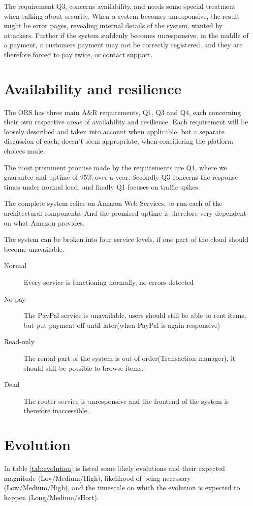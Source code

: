 The requirement Q3, concerns availability, and needs some special treatment
when talking about security. When a system becomes unresponsive, the result
might be error pages, revealing internal details of the system, wanted by
attackers. Further if the system suddenly becomes unresponsive, in the middle
of a payment, a customers payment may not be correctly registered, and they are
therefore forced to pay twice, or contact support.

\section{Availability and resilience}
\label{sec:avail-resil}
The ORS has three main A\&R requirements, Q1, Q3 and Q4, each concerning their
own respective areas of availability and resilience. Each requirement will be
loosely described and taken into account when applicable, but a separate
discussion of each, doesn't seem appropriate, when considering the platform 
choices made.

The most prominent promise made by the requirements are Q4, where we guarantee
and uptime of 95\% over a year. Secondly Q3 concerns the response times under
normal load, and finally Q1 focuses on traffic spikes.

The complete system relies on Amazon Web Services, to run each of the
architectural components. And the promised uptime is therefore very dependent
on what Amazon provides.

The system can be broken into four service levels, if one part of the cloud
should become unavailable.

\begin{description}
    \item[Normal] Every service is functioning normally, no errors detected
    \item[No-pay] The PayPal service is unavailable, users should still be able
        to rent items, but put payment off until later(when PayPal is again
        responsive)
    \item[Read-only] The rental part of the system is out of order(Transaction
        manager), it should still be possible to browse items.
    \item[Dead] The router service is unresponsive and the frontend of the
        system is therefore inaccessible.
\end{description}

\section{Evolution}
\label{sec:evolution}
In table \ref{tab:evolution} is listed some likely evolutions and their
expected magnitude (Lov/Medium/High), likelihood of being necessary
(Low/Medium/High), and the timescale on which the evolution is expected to
happen (Long/Medium/sHort).


